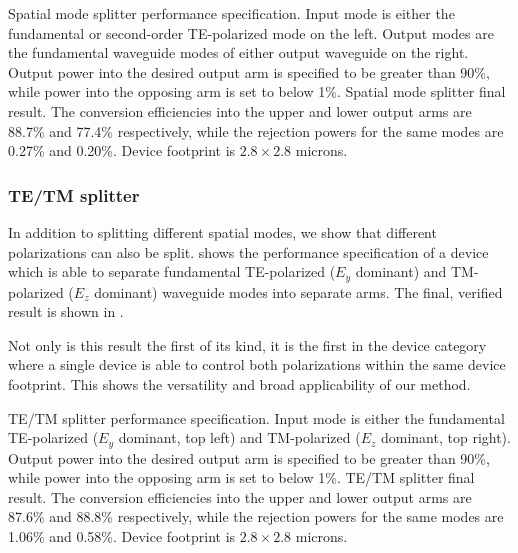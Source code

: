 \documentclass[letterpaper,10pt]{article}
\begin{document}
    {Spatial mode splitter performance specification.
    Input mode is either the fundamental or second-order
        TE-polarized mode on the left.
    Output modes are the fundamental waveguide modes of either output 
        waveguide on the right.
    Output power into the desired output arm is specified to be greater than 90\%,
        while power into the opposing arm is set to below 1\%.}
    {Spatial mode splitter final result.
    The conversion efficiencies into the upper and lower output arms
        are 88.7\% and 77.4\% respectively, 
        while the rejection powers for the same modes are 0.27\% and 0.20\%.
    Device footprint is $2.8\times2.8$ microns.}

\subsubsection{TE/TM splitter}
In addition to splitting different spatial modes, 
    we show that different polarizations can also be split.
 shows the performance specification of a 
    device which is able to separate fundamental TE-polarized ($E_y$ dominant)
    and TM-polarized ($E_z$ dominant)
    waveguide modes into separate arms.
The final, verified result is shown in .

Not only is this result the first of its kind,
    it is the first in the device category where a single device
    is able to control both polarizations within the same device footprint.
This shows the versatility and broad applicability of our method.

    {TE/TM splitter performance specification.
    Input mode is either the fundamental TE-polarized ($E_y$ dominant, top left)
    and TM-polarized ($E_z$ dominant, top right).
    Output power into the desired output arm is specified to be greater than 90\%,
        while power into the opposing arm is set to below 1\%.}
    {TE/TM splitter final result.
    The conversion efficiencies into the upper and lower output arms
        are 87.6\% and 88.8\% respectively, 
        while the rejection powers for the same modes are 1.06\% and 0.58\%.
    Device footprint is $2.8\times2.8$ microns.}
\end{document}
